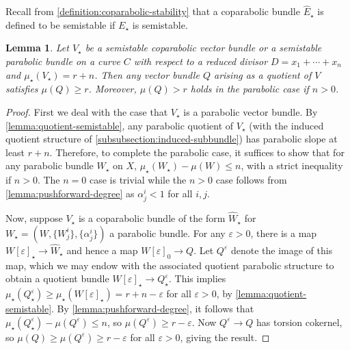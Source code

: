 \documentclass[12 pt]{amsart}
\theoremstyle{plain}
\newtheorem{lemma}[subsubsection]{Lemma}
\theoremstyle{definition}
\theoremstyle{remark}
\numberwithin{equation}{section}
\begin{document}
Recall from 
\autoref{definition:coparabolic-stability} that a coparabolic bundle $\widehat{E}_\star$ is defined to be
semistable if $E_\star$ is semistable.
\begin{lemma}
	\label{lemma:quotient-slope}
	Let $V_\star$ be a semistable coparabolic vector
	bundle or a semistable parabolic bundle on a curve $C$ with respect to a
	reduced divisor $D=x_1+\cdots +x_n$ and $\mu_\star(V_\star)=r+n$.
	Then any vector bundle $Q$ arising as a quotient of $V$ satisfies
	$\mu(Q)\geq r$. 
	Moreover, $\mu(Q) > r$ holds in the parabolic case if $n > 0$.
\end{lemma}
\begin{proof}
	First we deal with the case that $V_\star$ is a parabolic vector bundle.
	By \autoref{lemma:quotient-semistable}, any 
	parabolic quotient of $V_\star$ 
	(with the induced quotient structure of
	\autoref{subsubsection:induced-subbundle})	
	has parabolic slope at least $r+n$.
	Therefore, to complete the parabolic case, 
	it suffices to show that for any parabolic bundle $W_\star$ on $X$,
	$\mu_\star(W_\star) - \mu(W) \leq n$, with a strict inequality if $n >
	0$.
	The $n = 0$ case is trivial while the $n > 0$ case
	follows from \autoref{lemma:pushforward-degree} as $\alpha^i_j < 1$ for
	all $i, j$.

	Now, suppose $V_\star$ is a coparabolic bundle of the form $\widehat{W}_\star$ for $W_\star =
	(W, \{W^i_j\}, \{\alpha^i_j\})$ a parabolic bundle.
	For any $\varepsilon > 0$, there is a map $W[\varepsilon]_\star \to
	\widehat{W}_\star$ and hence a map $W[\varepsilon]_0 \to Q$.
	Let $Q^\varepsilon$ denote the image of this map, which we may endow
	with the associated quotient parabolic structure to obtain a quotient
	bundle
	$W[\varepsilon]_\star \to Q^\varepsilon_\star$.
	This implies 
	$\mu_\star(Q^\varepsilon_\star) \geq \mu_\star(W[\varepsilon]_\star) = r + n - \varepsilon$ 
	for all $\varepsilon > 0$, by \autoref{lemma:quotient-semistable}.
	By \autoref{lemma:pushforward-degree}, it follows that
        $\mu_\star(Q^\varepsilon_\star) - \mu(Q^\varepsilon) \leq n$, so
	$\mu(Q^\varepsilon) \geq r-\varepsilon$. Now $Q^\varepsilon\to Q$ has
	torsion cokernel, so $\mu(Q)\geq \mu(Q^\varepsilon)\geq r-\varepsilon$
	for all $\varepsilon>0$, giving the result.
\end{proof}
\end{document}
